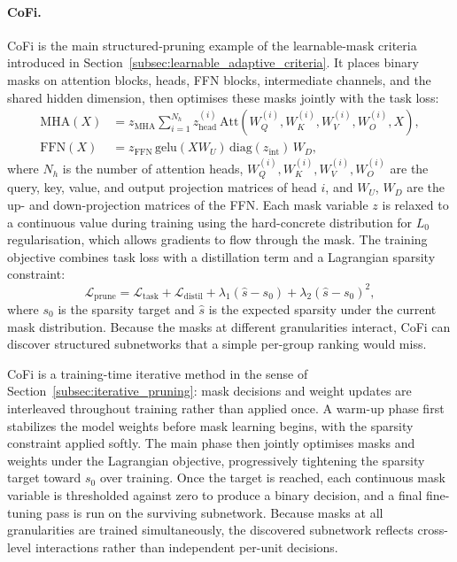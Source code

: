 \methodsep

\paragraph{CoFi.}
CoFi \cite{xia2022structured} is the main structured-pruning example of the learnable-mask criteria introduced in Section~\ref{subsec:learnable_adaptive_criteria}. It places binary masks on attention blocks, heads, FFN blocks, intermediate channels, and the shared hidden dimension, then optimises these masks jointly with the task loss:
\begin{align}
	\mathrm{MHA}(X) &= z_{\mathrm{MHA}} \sum_{i=1}^{N_h} z_{\mathrm{head}}^{(i)} \,\mathrm{Att}\!\left(W_Q^{(i)},W_K^{(i)},W_V^{(i)},W_O^{(i)},X\right), \\
	\mathrm{FFN}(X) &= z_{\mathrm{FFN}}\, \mathrm{gelu}(XW_U)\,\mathrm{diag}(z_{\mathrm{int}})\,W_D,
\end{align}
where $N_h$ is the number of attention heads, $W_Q^{(i)}, W_K^{(i)}, W_V^{(i)}, W_O^{(i)}$ are the query, key, value, and output projection matrices of head $i$, and $W_U$, $W_D$ are the up- and down-projection matrices of the FFN. Each mask variable $z$ is relaxed to a continuous value during training using the hard-concrete distribution for $L_0$ regularisation, which allows gradients to flow through the mask. The training objective combines task loss with a distillation term and a Lagrangian sparsity constraint:
\begin{equation}
	\mathcal{L}_{\mathrm{prune}}
	=
	\mathcal{L}_{\mathrm{task}}
	+
	\mathcal{L}_{\mathrm{distil}}
	+
	\lambda_1(\hat s - s_0)
	+
	\lambda_2(\hat s - s_0)^2,
\end{equation}
where $s_0$ is the sparsity target and $\hat{s}$ is the expected sparsity under the current mask distribution. Because the masks at different granularities interact, CoFi can discover structured subnetworks that a simple per-group ranking would miss.

CoFi is a training-time iterative method in the sense of Section~\ref{subsec:iterative_pruning}: mask decisions and weight updates are interleaved throughout training rather than applied once. A warm-up phase first stabilizes the model weights before mask learning begins, with the sparsity constraint applied softly. The main phase then jointly optimises masks and weights under the Lagrangian objective, progressively tightening the sparsity target toward $s_0$ over training. Once the target is reached, each continuous mask variable is thresholded against zero to produce a binary decision, and a final fine-tuning pass is run on the surviving subnetwork. Because masks at all granularities are trained simultaneously, the discovered subnetwork reflects cross-level interactions rather than independent per-unit decisions.

